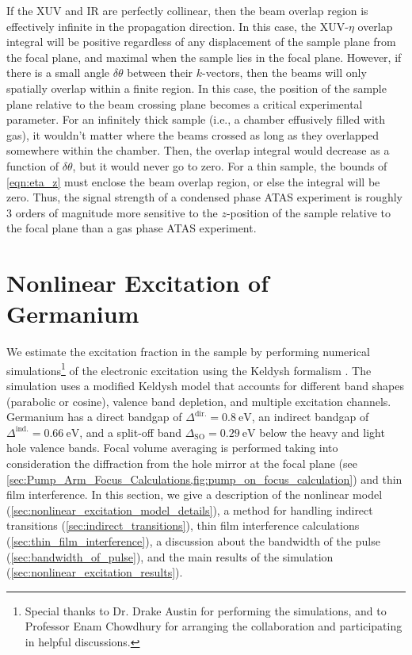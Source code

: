 If the XUV and IR are perfectly collinear, then the beam overlap region is effectively infinite in the propagation direction. In this case, the XUV-$\eta$ overlap integral will be positive regardless of any displacement of the sample plane from the focal plane, and maximal when the sample lies in the focal plane. However, if there is a small angle $\delta \theta$ between their $k$-vectors, then the beams will only spatially overlap within a finite region. In this case, the position of the sample plane relative to the beam crossing plane becomes a critical experimental parameter. For an infinitely thick sample (i.e., a chamber effusively filled with gas), it wouldn't matter where the beams crossed as long as they overlapped somewhere within the chamber. Then, the overlap integral would decrease as a function of $\delta \theta$, but it would never go to zero. For a thin sample, the bounds of \cref{eqn:eta_z} must enclose the beam overlap region, or else the integral will be zero. Thus, the signal strength of a condensed phase ATAS experiment is roughly 3 orders of magnitude more sensitive to the $z$-position of the sample relative to the focal plane than a gas phase ATAS experiment.


\section{Nonlinear Excitation of Germanium}
\label{sec:nonlinear_excitation_germanium}

We estimate the excitation fraction in the sample by performing numerical simulations\footnote{Special thanks to Dr. Drake Austin for performing the simulations, and to Professor Enam Chowdhury for arranging the collaboration and participating in helpful discussions.} of the electronic excitation using the Keldysh formalism \cite{sergaevaUltrafastExcitationConductionband2018,keldyshIonizationFieldStrong1965,vpopruzhenkoKeldyshTheoryStrong2014}. The simulation uses a modified Keldysh model that accounts for different band shapes (parabolic or cosine), valence band depletion, and multiple excitation channels. Germanium has a direct bandgap of $\Delta^{\textrm{dir.}} = 0.8 \ \textrm{eV}$, an indirect bandgap of $\Delta^{\textrm{ind.}} = 0.66 \ \textrm{eV}$, and a split-off band $\Delta_{\textrm{SO}} = 0.29 \ \textrm{eV}$ below the heavy and light hole valence bands. Focal volume averaging is performed taking into consideration the diffraction from the hole mirror at the focal plane (see \cref{sec:Pump_Arm_Focus_Calculations,fig:pump_on_focus_calculation}) and thin film interference. In this section, we give a description of the nonlinear model (\cref{sec:nonlinear_excitation_model_details}), a method for handling indirect transitions (\cref{sec:indirect_transitions}), thin film interference calculations (\cref{sec:thin_film_interference}), a discussion about the bandwidth of the pulse (\cref{sec:bandwidth_of_pulse}), and the main results of the simulation (\cref{sec:nonlinear_excitation_results}).

